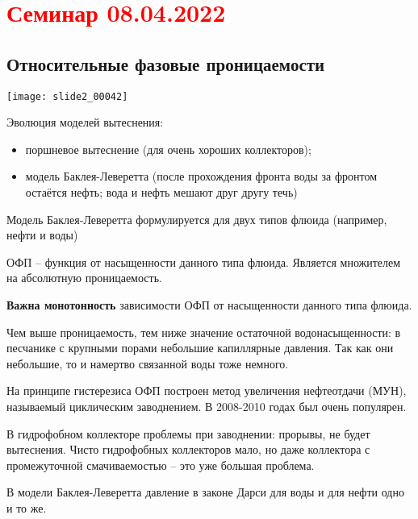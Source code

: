 \documentclass[main.tex]{subfiles}
\begin{document}
\section{\textcolor{red}{Семинар 08.04.2022}}

\subsection{Относительные фазовые проницаемости}

\texttt{[image: slide2\_00042]}

Эволюция моделей вытеснения:
\begin{itemize}
	\item поршневое вытеснение (для очень хороших коллекторов);
	\item модель Баклея-Леверетта (после прохождения фронта воды за фронтом остаётся нефть; вода и нефть мешают друг другу течь)
\end{itemize}

Модель Баклея-Леверетта формулируется для двух типов флюида (например, нефти и воды)

ОФП -- функция от насыщенности данного типа флюида. Является множителем на абсолютную проницаемость.

\textbf{Важна монотонность} зависимости ОФП от насыщенности данного типа флюида.


Чем выше проницаемость, тем ниже значение остаточной водонасыщенности: в песчанике с крупными порами небольшие капиллярные давления. Так как они небольшие, то и намертво связанной воды тоже немного.





На принципе гистерезиса ОФП построен метод увеличения нефтеотдачи (МУН), называемый циклическим заводнением. В 2008-2010 годах был очень популярен.

В гидрофобном коллекторе проблемы при заводнении: прорывы, не будет вытеснения. Чисто гидрофобных коллекторов мало, но даже коллектора с промежуточной смачиваемостью -- это уже большая проблема.


В модели Баклея-Леверетта давление в законе Дарси для воды и для нефти одно и то же.
\end{document}
